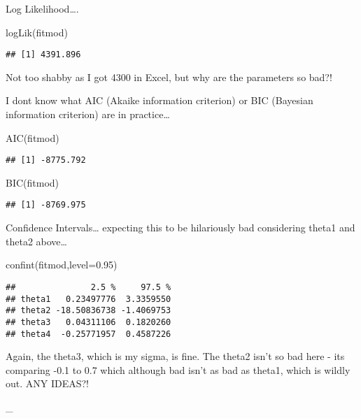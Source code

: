 \documentclass[
]{article}
\newenvironment{Shaded}{\begin{snugshade}}{\end{snugshade}}
\newcommand{\AttributeTok}[1]{\textcolor[rgb]{0.77,0.63,0.00}{#1}}
\newcommand{\FloatTok}[1]{\textcolor[rgb]{0.00,0.00,0.81}{#1}}
\newcommand{\FunctionTok}[1]{\textcolor[rgb]{0.00,0.00,0.00}{#1}}
\newcommand{\NormalTok}[1]{#1}
\begin{document}
Log Likelihood\ldots.

\begin{Shaded}
\begin{Highlighting}[]
\FunctionTok{logLik}\NormalTok{(fitmod)}
\end{Highlighting}
\end{Shaded}

\begin{verbatim}
## [1] 4391.896
\end{verbatim}

Not too shabby as I got 4300 in Excel, but why are the parameters so
bad?!

I dont know what AIC (Akaike information criterion) or BIC (Bayesian
information criterion) are in practice\ldots{}

\begin{Shaded}
\begin{Highlighting}[]
\FunctionTok{AIC}\NormalTok{(fitmod)}
\end{Highlighting}
\end{Shaded}

\begin{verbatim}
## [1] -8775.792
\end{verbatim}

\begin{Shaded}
\begin{Highlighting}[]
\FunctionTok{BIC}\NormalTok{(fitmod)}
\end{Highlighting}
\end{Shaded}

\begin{verbatim}
## [1] -8769.975
\end{verbatim}

Confidence Intervals\ldots{} expecting this to be hilariously bad
considering theta1 and theta2 above\ldots{}

\begin{Shaded}
\begin{Highlighting}[]
\FunctionTok{confint}\NormalTok{(fitmod,}\AttributeTok{level=}\FloatTok{0.95}\NormalTok{)}
\end{Highlighting}
\end{Shaded}

\begin{verbatim}
##               2.5 %     97.5 %
## theta1   0.23497776  3.3359550
## theta2 -18.50836738 -1.4069753
## theta3   0.04311106  0.1820260
## theta4  -0.25771957  0.4587226
\end{verbatim}

Again, the theta3, which is my sigma, is fine. The theta2 isn't so bad
here - its comparing -0.1 to 0.7 which although bad isn't as bad as
theta1, which is wildly out. ANY IDEAS?!

\_
\end{document}
